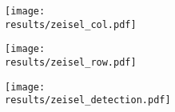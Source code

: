 \documentclass{article}
\begin{document}
\newcommand{\results}{../../real/zeisel/pics}

\begin{figure}[btp]
    \begin{subfigure}[b]{0.49\textwidth}
        \texttt{[image: \\results/zeisel\_col.pdf]}
        \caption{}
    \end{subfigure}
    \begin{subfigure}[b]{0.49\textwidth}
        \texttt{[image: \\results/zeisel\_row.pdf]}
        \caption{}
    \end{subfigure}
    \begin{subfigure}[b]{\textwidth}
        \texttt{[image: \\results/zeisel\_detection.pdf]}
        \caption{}
    \end{subfigure}
\end{figure}
\end{document}
